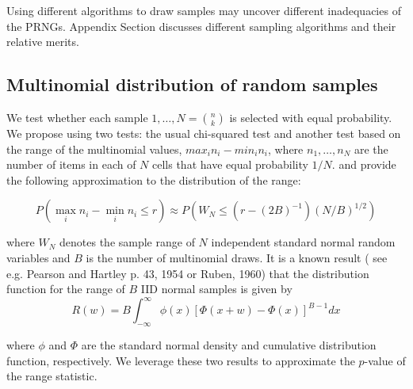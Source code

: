 \documentclass[12pt]{article}
\newcommand{\todo}[1]{{\color{red}{TO DO: \sc #1}}}
\begin{document}
Using different algorithms to draw samples may uncover different inadequacies of the PRNGs.
Appendix Section\todo{reference} discusses different sampling algorithms and their relative merits.


\todo{ question: do we believe that ability to generate SRSs is a measure of a good PRNG, or are we only interested in testing this capability in order to do Statistics?}

\subsection{Multinomial distribution of random samples}

We test whether each sample $1, \dots, N = {n \choose k}$ is selected with equal probability. 
We propose using two tests: the usual chi-squared test and another test based on the range of the multinomial values, $max_i n_i - min_i n_i$, where $n_1, \dots, n_N$ are the number of items in each of $N$ cells that have equal probability $1/N$.
\citet{johnson_applications_1960} and \citet{young_two_1962} provide the following approximation to the distribution of the range:

$$P(\max_i n_i - \min_i n_i \leq r) \approx P(W_N \leq (r-(2B)^{-1})(N/B)^{1/2})$$

\noindent where $W_N$ denotes the sample range of $N$ independent standard normal random variables and $B$ is the number of multinomial draws. 
It is a known result (\todo{} see e.g. Pearson and Hartley p. 43, 1954 or Ruben, 1960) that the distribution function for the range of $B$ IID normal samples is given by
$$R(w) = B \int_{-\infty}^{\infty} \phi(x)\left[ \Phi(x+w) - \Phi(x)\right]^{B-1}dx$$

\noindent where $\phi$ and $\Phi$ are the standard normal density and cumulative distribution function, respectively. 
We leverage these two results to approximate the $p$-value of the range statistic.
\end{document}
